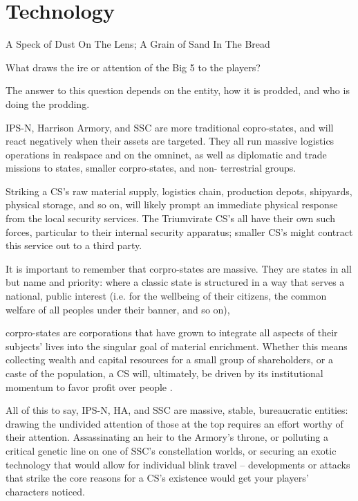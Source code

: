 \chapter{Technology}
A Speck of Dust On The Lens; A Grain of Sand In The Bread

What draws the ire or attention of the Big 5 to the players?

The answer to this question depends on the entity, how it is prodded, and who is doing the
prodding.

IPS-N, Harrison Armory, and SSC are more traditional copro-states, and will react negatively
when their assets are targeted. They all run massive logistics operations in realspace and on the
omninet, as well as diplomatic and trade missions to states, smaller corpro-states, and non-
terrestrial groups.

Striking a CS’s raw material supply, logistics chain, production depots, shipyards, physical
storage, and so on, will likely prompt an immediate physical response from the local security
services. The Triumvirate CS’s all have their own such forces, particular to their internal security
apparatus; smaller CS’s might contract this service out to a third party.

It is important to remember that corpro-states are massive. They are states in all but name and
priority: where a classic state is structured in a way that serves a national, public interest (i.e. for
the wellbeing of their citizens, the common welfare of all peoples under their banner, and so on),




corpro-states are corporations that have grown to integrate all aspects of their subjects’ lives into
the singular goal of material enrichment. Whether this means collecting wealth and capital
resources for a small group of shareholders, or a caste of the population, a CS will, ultimately, be
driven by its institutional momentum to favor profit over people .

All of this to say, IPS-N, HA, and SSC are massive, stable, bureaucratic entities: drawing the
undivided attention of those at the top requires an effort worthy of their attention. Assassinating an
heir to the Armory’s throne, or polluting a critical genetic line on one of SSC’s constellation worlds,
or securing an exotic technology that would allow for individual blink travel -- developments or
attacks that strike the core reasons for a CS’s existence would get your players’ characters
noticed.

